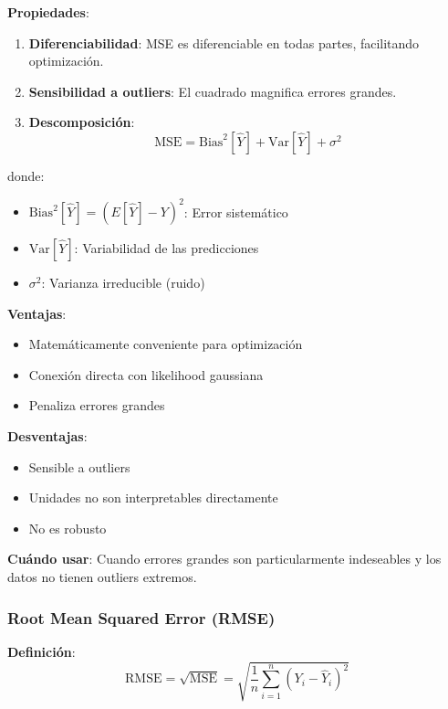 \documentclass[
  doc,
  floatsintext,
  longtable,
  a4paper,
  nolmodern,
  notxfonts,
  notimes,
  12pt,
  colorlinks=true,linkcolor=blue,citecolor=blue,urlcolor=blue]{apa7}
\providecommand{\tightlist}{%
  \setlength{\itemsep}{0pt}\setlength{\parskip}{0pt}}
\begin{document}
\textbf{Propiedades}:

\begin{enumerate}
\def\labelenumi{\arabic{enumi}.}
\item
  \textbf{Diferenciabilidad}: MSE es diferenciable en todas partes,
  facilitando optimización.
\item
  \textbf{Sensibilidad a outliers}: El cuadrado magnifica errores
  grandes.
\item
  \textbf{Descomposición}: \[
  \text{MSE} = \text{Bias}^2[\hat{Y}] + \text{Var}[\hat{Y}] + \sigma^2
  \]
\end{enumerate}

donde:

\begin{itemize}
\tightlist
\item
  \(\text{Bias}^2[\hat{Y}] = (E[\hat{Y}] - Y)^2\): Error sistemático
\item
  \(\text{Var}[\hat{Y}]\): Variabilidad de las predicciones
\item
  \(\sigma^2\): Varianza irreducible (ruido)
\end{itemize}

\textbf{Ventajas}:

\begin{itemize}
\tightlist
\item
  Matemáticamente conveniente para optimización
\item
  Conexión directa con likelihood gaussiana
\item
  Penaliza errores grandes
\end{itemize}

\textbf{Desventajas}:

\begin{itemize}
\tightlist
\item
  Sensible a outliers
\item
  Unidades no son interpretables directamente
\item
  No es robusto
\end{itemize}

\textbf{Cuándo usar}: Cuando errores grandes son particularmente
indeseables y los datos no tienen outliers extremos.

\subsubsection{Root Mean Squared Error
(RMSE)}\label{root-mean-squared-error-rmse}

\textbf{Definición}: \[
\text{RMSE} = \sqrt{\text{MSE}} = \sqrt{\frac{1}{n} \sum_{i=1}^{n} (Y_i - \hat{Y}_i)^2}
\]
\end{document}
